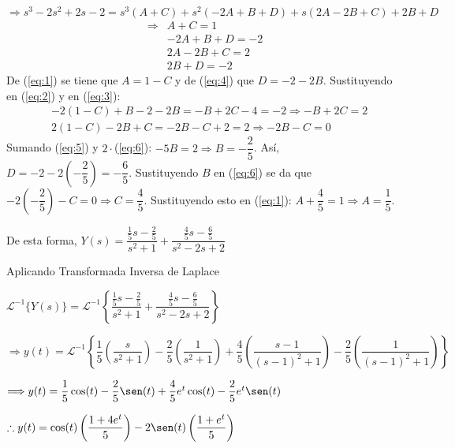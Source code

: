 \documentclass[fleqn]{article}
\begin{document}
    $ \Longrightarrow s^3 - 2s^2 + 2s - 2 = s^3(A + C) + s^2(-2A + B + D) + s(2A - 2B + C) + 2B + D $
    \begin{align}
        \Longrightarrow & A + C = 1 \label{eq:1} \\
        & -2A + B + D = -2 \label{eq:2} \\
        & 2A - 2B + C = 2 \label{eq:3} \\
        & 2B + D = -2 \label{eq:4}
    \end{align}
    De (\ref{eq:1}) se tiene que $ A = 1 - C $ y de (\ref{eq:4}) que $ D = - 2 - 2B $. Sustituyendo en (\ref{eq:2}) y en (\ref{eq:3}):
    \begin{align}
        & -2(1 - C) + B - 2 - 2B = -B + 2C - 4 = -2 \Longrightarrow -B + 2C = 2 \label{eq:5} \\
        & 2(1 - C) - 2B + C = -2B - C + 2 = 2 \Longrightarrow -2B - C = 0 \label{eq:6}
    \end{align}
    Sumando (\ref{eq:5}) y $ 2 \cdot $(\ref{eq:6}): $ -5B = 2 \Longrightarrow B = - \dfrac{2}{5} $. Así, $ D = - 2 - 2\left(- \dfrac{2}{5} \right) = - \dfrac{6}{5} $. Sustituyendo $ B $ en (\ref{eq:6}) se da que $ -2 \left(- \dfrac{2}{5} \right) - C = 0 \Longrightarrow C = \dfrac{4}{5} $. Sustituyendo esto en (\ref{eq:1}): $ A + \dfrac{4}{5} = 1 \Longrightarrow A = \dfrac{1}{5} $.

    De esta forma, $ Y(s) = \dfrac{\frac{1}{5} s - \frac{2}{5}}{s^2 + 1} + \dfrac{\frac{4}{5} s - \frac{6}{5}}{s^2 - 2s + 2} $

    Aplicando Transformada Inversa de Laplace

    $ \mathscr{L}^{-1} \lbrace Y(s) \rbrace = \mathscr{L}^{-1} \left\lbrace \dfrac{\frac{1}{5} s - \frac{2}{5}}{s^2 + 1} + \dfrac{\frac{4}{5} s - \frac{6}{5}}{s^2 - 2s + 2} \right\rbrace $ 

    $ \Longrightarrow y(t) = \mathscr{L}^{-1} \left\lbrace \dfrac{1}{5} \left( \dfrac{s}{s^2 + 1} \right) - \dfrac{2}{5} \left( \dfrac{1}{s^2 + 1} \right) + \dfrac{4}{5} \left( \dfrac{s - 1}{(s - 1)^2 + 1} \right) - \dfrac{2}{5} \left( \dfrac{1}{(s - 1)^2 + 1} \right) \right\rbrace $

    $ \Longrightarrow y(t) = \dfrac{1}{5} \cos(t) - \dfrac{2}{5} \sen (t) + \dfrac{4}{5} e^t \cos (t) - \dfrac{2}{5} e^t \sen (t) $

    $ \therefore y(t) = \cos(t) \left( \dfrac{1 + 4e^t}{5} \right) - 2 \sen (t) \left( \dfrac{1 + e^t}{5} \right) $
\end{document}
